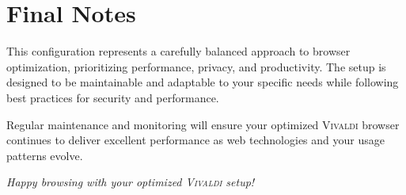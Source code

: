 \documentclass[11pt,a4paper,oneside]{book}
\newcommand{\vivaldi}{\textsc{Vivaldi}}
\begin{document}
\section{Final Notes}

This configuration represents a carefully balanced approach to browser optimization, prioritizing performance, privacy, and productivity. The setup is designed to be maintainable and adaptable to your specific needs while following best practices for security and performance.

Regular maintenance and monitoring will ensure your optimized \vivaldi{} browser continues to deliver excellent performance as web technologies and your usage patterns evolve.

\begin{center}
\textit{Happy browsing with your optimized \vivaldi{} setup!}
\end{center}
\end{document}
